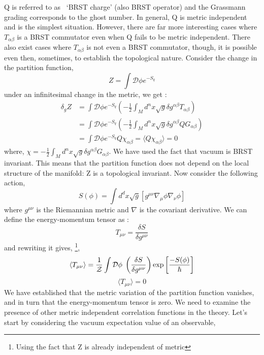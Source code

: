 Q is referred to as ~`BRST charge' (also BRST operator) and the Grassmann grading corresponds to the ghost number. 
In general, Q is metric independent and is the simplest situation. However, there are far more interesting cases 
where $T_{\alpha\beta}$ is a BRST commutator even when Q fails to be metric independent. There also exist cases 
where $T_{\alpha\beta}$ is not even a BRST commutator, though, it is possible even then, sometimes, to establish the
topological nature. Consider the change in the partition function, 
\begin{equation}
Z = \int \mathcal{D} \phi e^{-S_{q}}
\end{equation}
under an infinitesimal change in the metric, we get :
\begin{align}
\delta_{g} Z&= \int \mathcal{D} \phi e^{-S_{q}} \left(-\frac{1}{2} \int_{M} d^{n} x 
\sqrt{g} \delta g^{\alpha\beta} T_{\alpha\beta}\right)\\
&=\int \mathcal{D} \phi e^{-S_{q}} \left(-\frac{1}{2} \int_{M} d^{n} x 
\sqrt{g} \delta g^{\alpha\beta} QG_{\alpha\beta}\right)\\
&=\int \mathcal{D} \phi e^{-S_{q}} Q\chi_{\alpha\beta} = \langle Q\chi_{\alpha\beta}\rangle = 0
\end{align}
where, $ \chi = - \frac{1}{2} \int_{M} d^{n}x \sqrt{g} \delta g^{\alpha\beta} G_{\alpha\beta}$. We have 
used the fact that vacuum is BRST invariant. 
This means that the partition function does not depend on the local structure of the manifold: 
Z is a topological invariant. 
Now consider the following action, 
\begin{equation}
S(\phi) = \int d^{d} x \sqrt{g} \left[g^{\mu\nu} \nabla_{\mu} \phi  \nabla_{\nu} \phi \right]
\end{equation}
where $g^{\mu\nu}$ is the Riemannian metric and $\nabla$ is the covariant derivative. We can define the energy-momentum tensor as :
\begin{equation}
T_{\mu\nu} = \frac{\delta S}{\delta g^{\mu\nu}} 
\end{equation}
and rewriting it gives, \footnote{Using the fact that Z is already independent of metric},  
\begin{equation}
\langle T_{\mu\nu} \rangle =  \frac{1}{\mathcal{Z}}\int \mathcal{D} \phi \hspace{1mm} \left(\frac{\delta S}{\delta g^{\mu\nu}}\right) \exp\left[\frac{-S(\phi)}{\hbar}\right]  
\end{equation}
\begin{equation}
\langle T_{\mu\nu} \rangle= 0
\end{equation}
We have established that the metric variation of the partition function vanishes, and in turn that the energy-momentum tensor is zero. We need to examine the presence of other metric independent correlation functions in the theory. 
Let's start by considering the vacuum expectation value of an observable, 

